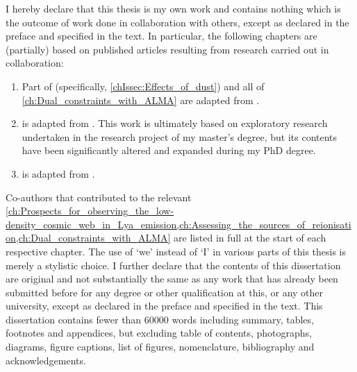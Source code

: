 
\begin{declaration}


    I hereby declare that this thesis is my own work and contains nothing which is the outcome of work done in collaboration with others, except as declared in the preface and specified in the text. In particular, the following chapters are (partially) based on published articles resulting from research carried out in collaboration:
    \begin{enumerate}[label=(\roman*)]
        \item Part of  (specifically, \cref{chIssec:Effects_of_dust}) and all of \cref{ch:Dual_constraints_with_ALMA} are adapted from \citet{2022MNRAS.515.1751W}.
        \item {} is adapted from \citet{2021A&A...650A..98W}. This work is ultimately based on exploratory research undertaken in the research project of my master's degree, but its contents have been significantly altered and expanded during my PhD degree.
        \item {} is adapted from \citet{2021MNRAS.508.1686W}.
    \end{enumerate}
    
    \noindent Co-authors that contributed to the relevant \cref{ch:Prospects_for_observing_the_low-density_cosmic_web_in_Lya_emission,ch:Assessing_the_sources_of_reionisation,ch:Dual_constraints_with_ALMA} are listed in full at the start of each respective chapter. The use of `we' instead of `I' in various parts of this thesis is merely a stylistic choice. I further declare that the contents of this dissertation are original and not substantially the same as any work that has already been submitted before for any degree or other qualification at this, or any other university, except as declared in the preface and specified in the text. This dissertation contains fewer than \num{60000} words including summary, tables, footnotes and appendices, but excluding table of contents, photographs, diagrams, figure captions, list of figures, nomenclature, bibliography and acknowledgements.
    

\end{declaration}


